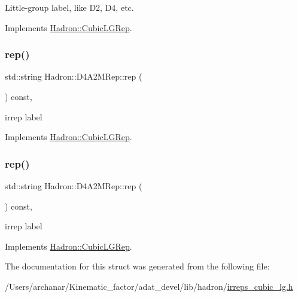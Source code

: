 Little-\/group label, like D2, D4, etc. 

Implements \mbox{\hyperlink{structHadron_1_1CubicLGRep_a9bdb14b519a611d21379ed96a3a9eb41}{Hadron\+::\+Cubic\+L\+G\+Rep}}.

\mbox{\label{structHadron_1_1D4A2MRep_ab6b82d71a2ad447c611e9b26784bc880}} 
\subsubsection{\texorpdfstring{rep()}{rep()}\hspace{0.1cm}{\footnotesize\ttfamily [1/2]}}
{\footnotesize\ttfamily std\+::string Hadron\+::\+D4\+A2\+M\+Rep\+::rep (\begin{DoxyParamCaption}{ }\end{DoxyParamCaption}) const\hspace{0.3cm}{\ttfamily [inline]}, {\ttfamily [virtual]}}

irrep label 

Implements \mbox{\hyperlink{structHadron_1_1CubicLGRep_a50f5ddbb8f4be4cee0106fa9e8c75e6c}{Hadron\+::\+Cubic\+L\+G\+Rep}}.

\mbox{\label{structHadron_1_1D4A2MRep_ab6b82d71a2ad447c611e9b26784bc880}} 
\subsubsection{\texorpdfstring{rep()}{rep()}\hspace{0.1cm}{\footnotesize\ttfamily [2/2]}}
{\footnotesize\ttfamily std\+::string Hadron\+::\+D4\+A2\+M\+Rep\+::rep (\begin{DoxyParamCaption}{ }\end{DoxyParamCaption}) const\hspace{0.3cm}{\ttfamily [inline]}, {\ttfamily [virtual]}}

irrep label 

Implements \mbox{\hyperlink{structHadron_1_1CubicLGRep_a50f5ddbb8f4be4cee0106fa9e8c75e6c}{Hadron\+::\+Cubic\+L\+G\+Rep}}.



The documentation for this struct was generated from the following file\+:\begin{DoxyCompactItemize}
\item 
/\+Users/archanar/\+Kinematic\+\_\+factor/adat\+\_\+devel/lib/hadron/\mbox{\hyperlink{lib_2hadron_2irreps__cubic__lg_8h}{irreps\+\_\+cubic\+\_\+lg.\+h}}\end{DoxyCompactItemize}
